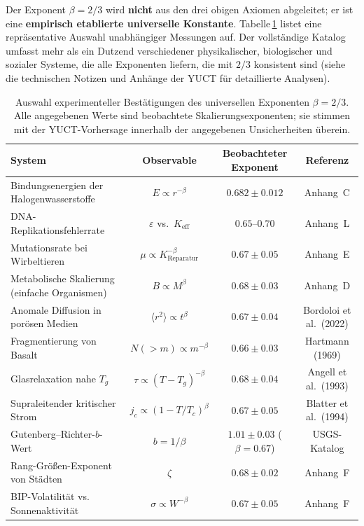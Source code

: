 \documentclass[12pt,a4paper]{article}
\begin{document}
	Der Exponent \(\beta = 2/3\) wird \textbf{nicht} aus den drei obigen Axiomen abgeleitet; er ist eine \textbf{empirisch etablierte universelle Konstante}.  Tabelle \ref{tab:beta-evidence} listet eine repräsentative Auswahl unabhängiger Messungen auf.  Der vollständige Katalog umfasst mehr als ein Dutzend verschiedener physikalischer, biologischer und sozialer Systeme, die alle Exponenten liefern, die mit \(2/3\) konsistent sind (siehe die technischen Notizen und Anhänge der YUCT für detaillierte Analysen).
	
	\begin{table}[htbp]
		\centering
		\caption{Auswahl experimenteller Bestätigungen des universellen Exponenten \(\beta = 2/3\).  Alle angegebenen Werte sind beobachtete Skalierungsexponenten; sie stimmen mit der YUCT-Vorhersage innerhalb der angegebenen Unsicherheiten überein.}
		\label{tab:beta-evidence}
		\scriptsize
		\begin{tabular}{l c c c}
			\toprule
			\textbf{System} & \textbf{Observable} & \textbf{Beobachteter Exponent} & \textbf{Referenz} \\
			\midrule
			Bindungsenergien der Halogenwasserstoffe & \(E \propto r^{-\beta}\) & \(0.682 \pm 0.012\) & Anhang~C \\
			DNA-Replikationsfehlerrate & \(\varepsilon\) vs.\ \(K_{\mathrm{eff}}\) & \(0.65\text{--}0.70\) & Anhang~L \\
			Mutationsrate bei Wirbeltieren & \(\mu \propto K_{\mathrm{Reparatur}}^{-\beta}\) & \(0.67 \pm 0.05\) & Anhang~E \\
			Metabolische Skalierung (einfache Organismen) & \(B \propto M^{\beta}\) & \(0.68 \pm 0.03\) & Anhang~D \\
			Anomale Diffusion in porösen Medien & \(\langle r^2 \rangle \propto t^{\beta}\) & \(0.67 \pm 0.04\) & Bordoloi et al.\ (2022) \\
			Fragmentierung von Basalt & \(N(>m) \propto m^{-\beta}\) & \(0.66 \pm 0.03\) & Hartmann (1969) \\
			Glasrelaxation nahe \(T_g\) & \(\tau \propto (T-T_g)^{-\beta}\) & \(0.68 \pm 0.04\) & Angell et al.\ (1993) \\
			Supraleitender kritischer Strom & \(j_c \propto (1-T/T_c)^{\beta}\) & \(0.67 \pm 0.05\) & Blatter et al.\ (1994) \\
			Gutenberg–Richter-\(b\)-Wert & \(b = 1/\beta\) & \(1.01 \pm 0.03\) (\(\beta=0.67\)) & USGS-Katalog \\
			Rang-Größen-Exponent von Städten & \(\zeta\) & \(0.68 \pm 0.02\) & Anhang~F \\
			BIP-Volatilität vs. Sonnenaktivität & \(\sigma \propto W^{-\beta}\) & \(0.67 \pm 0.05\) & Anhang~F \\
			\bottomrule
		\end{tabular}
	\end{table}
	
\end{document}
